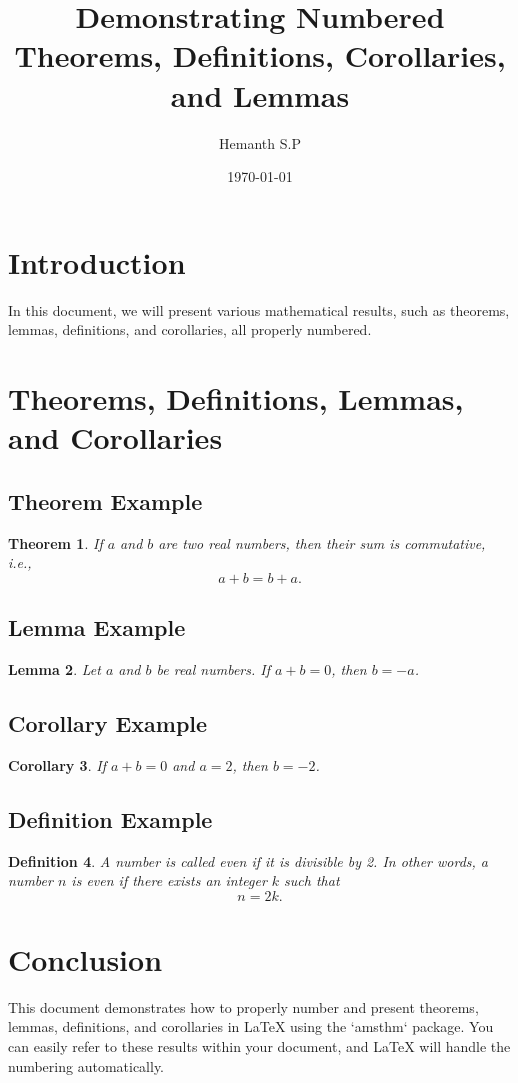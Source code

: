 \documentclass[a4paper,12pt]{article}
\newtheorem{theorem}{Theorem}[section] %
\newtheorem{lemma}[theorem]{Lemma} %
\newtheorem{corollary}[theorem]{Corollary} %
\newtheorem{definition}[theorem]{Definition} %
\begin{document}
 
\title{Demonstrating Numbered Theorems, Definitions, Corollaries, and Lemmas} 
\author{Hemanth S.P} %
\date{\today} 
\maketitle 
\section*{Introduction} In this document, we will present various mathematical results, such as 
theorems, lemmas, definitions, and corollaries, all properly numbered. 
\section{Theorems, Definitions, Lemmas, and Corollaries}  
\subsection*{Theorem Example} \begin{theorem} 
If \( a \) and \( b \) are two real numbers, then their sum is commutative, i.e.,  
\[ a + b = b + a. \] 
\end{theorem}  
\subsection*{Lemma Example}  
\begin{lemma}  
Let \( a \) and \( b \) be real numbers. If \( a + b = 0 \), then \( b = -a \).  
\end{lemma} 
\subsection*{Corollary Example}  
\begin{corollary} 
If \( a + b = 0 \) and \( a = 2 \), then \( b = -2 \).  
\end{corollary} 
\subsection*{Definition Example} 
\begin{definition}  
A number is called \textit{even} if it is divisible by 2. In other words, a number \( n \) is even if 
there exists an integer \( k \) such that  
\[ 
n = 2k. 
\]  
\end{definition}  
\section{Conclusion}  
This document demonstrates how to properly number and present theorems, lemmas, 
definitions, and corollaries in LaTeX using the `amsthm` package. You can easily refer to these 
results within your document, and LaTeX will handle the numbering automatically. 
\end{document}
